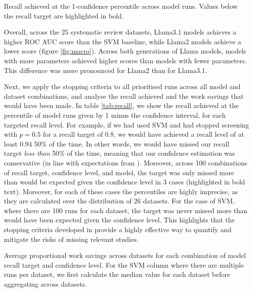 \documentclass{article}
\begin{document}
\begin{table}
	\centering
	
	\caption{Recall achieved at the 1-confidence percentile across model runs. Values below the recall target are highlighted in bold.}
	\label{tab:recall}
\end{table}

	
	
	Overall, across the 25 systematic review datasets, Llama3.1 models achieves a higher ROC AUC score than the SVM baseline, while Llama2 models achieve a lower score (figure \ref{fig:macro}). Across both generations of Llama models, models with more parameters achieved higher scores than models with fewer parameters. This difference was more pronounced for Llama2 than for Llama3.1. 
	
	Next, we apply the stopping criteria to all prioritised runs across all model and dataset combinations, and analyse the recall achieved and the work savings that would have been made. In table \ref{tab:recall}, we show the recall achieved at the percentile of model runs given by 1 minus the confidence interval, for each targeted recall level. 
	For example, if we had used SVM and had stopped screening with $p=0.5$ for a recall target of $0.8$, we would have achieved a recall level of at least $0.94$ 50\% of the time. In other words, we would have missed our recall target \textit{less than} 50\% of the time, meaning that our confidence estimation was conservative (in line with expectations from \cite{callaghan_statistical_2020}).
	Moreover, across 100 combinations of recall target, confidence level, and model, the target was only missed more than would be expected given the confidence level in 3 cases (highlighted in bold text). Moreover, for each of these cases the percentiles are highly imprecise, as they are calculated over the distribution of 26 datasets. For the case of SVM, where there are 100 runs for each dataset, the target was never missed more than would have been expected given the confidence level. This highlights that the stopping criteria developed in \cite{callaghan_statistical_2020} provide a highly effective way to quantify and mitigate the risks of missing relevant studies.
	
	\begin{table}
		\centering
		
		\caption{Average proportional work savings across datasets for each combination of  model recall target and confidence level. For the SVM column where there are multiple runs per dataset, we first calculate the median value for each dataset before aggregating across datasets.}
		\label{tab:wssp}
	\end{table}
	
\end{document}
